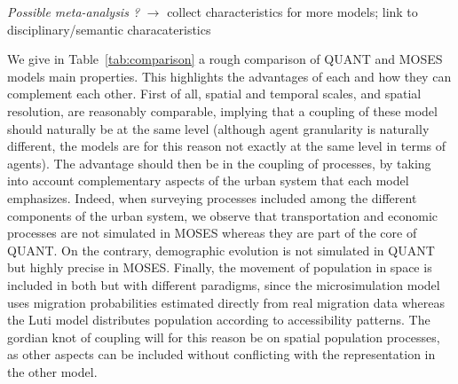 \documentclass[11pt]{article}
\begin{document}
\textit{Possible meta-analysis ?} $\rightarrow$ collect characteristics for more models; link to disciplinary/semantic characateristics



We give in Table~\ref{tab:comparison} a rough comparison of QUANT and MOSES models main properties. This highlights the advantages of each and how they can complement each other. First of all, spatial and temporal scales, and spatial resolution, are reasonably comparable, implying that a coupling of these model should naturally be at the same level (although agent granularity is naturally different, the models are for this reason not exactly at the same level in terms of agents). The advantage should then be in the coupling of processes, by taking into account complementary aspects of the urban system that each model emphasizes. Indeed, when surveying processes included among the different components of the urban system, we observe that transportation and economic processes are not simulated in MOSES whereas they are part of the core of QUANT. On the contrary, demographic evolution is not simulated in QUANT but highly precise in MOSES. Finally, the movement of population in space is included in both but with different paradigms, since the microsimulation model uses migration probabilities estimated directly from real migration data whereas the Luti model distributes population according to accessibility patterns. The gordian knot of coupling will for this reason be on spatial population processes, as other aspects can be included without conflicting with the representation in the other model.
\end{document}
